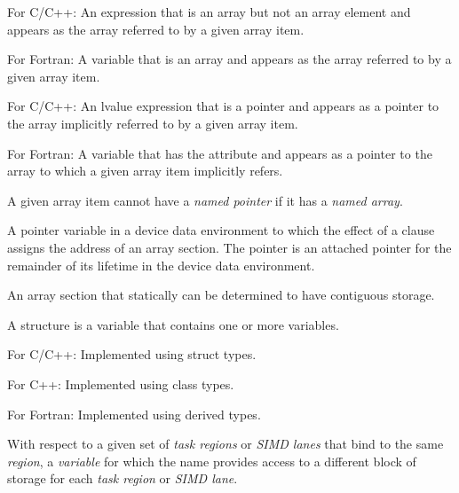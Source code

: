 \glossarydefstart
For C/C++:
\nopagebreak
An expression that is an array but not an array element and appears as the
array referred to by a given array item.

For Fortran:
\nopagebreak
A variable that is an array and appears as the array referred to by a given
array item.
\glossarydefend

\glossarydefstart
For C/C++:
\nopagebreak
An lvalue expression that is a pointer and appears as a pointer to the array
implicitly referred to by a given array item.

For Fortran:
\nopagebreak
A variable that has the  attribute and appears as a pointer to
the array to which a given array item implicitly refers.

\begin{adjustwidth}{-0.75in}{0in}
\begin{note}
A given array item cannot have a \emph{named pointer} if it has a \emph{named array}.
\end{note}
\end{adjustwidth}
\glossarydefend


\glossarydefstart
A pointer variable in a device data environment to which the effect of a  clause 
assigns the address of
an array section.  The pointer is
an attached pointer for the remainder of its lifetime in the device data environment.
\glossarydefend
\bigskip

\glossarydefstart
An array section that statically can be determined to have contiguous storage.
\glossarydefend
\bigskip

\glossarydefstart
A structure is a variable that contains one or more variables. 

For C/C++: 
\nopagebreak
Implemented using struct types.

For C++: 
\nopagebreak
Implemented using class types.        

For Fortran: 
\nopagebreak
Implemented using derived types.        
\glossarydefend

\glossarydefstart
With respect to a given set of \emph{task regions} or \emph{SIMD lanes} that bind to the same
 \emph{region}, a \emph{variable} for which the name provides access to a different block of 
storage for each \emph{task region} or \emph{SIMD lane}.

